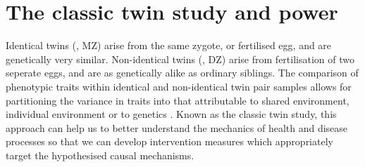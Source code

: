 \section{The classic twin study and power}
Identical twins (\mz, MZ) arise from the same zygote, or fertilised egg, and are genetically very similar.  Non-identical twins (\dz, DZ) arise from fertilisation of two seperate eggs, and are as genetically alike as ordinary siblings.  The comparison of phenotypic traits within identical and non-identical twin pair samples allows for partitioning the variance in traits into that attributable to  shared environment, individual environment or to genetics  \cite{Teare2011}.  Known as the classic twin study, this approach can help us to better understand the mechanics of health and disease processes so that we can develop intervention measures which appropriately target the hypothesised causal mechanisms.

